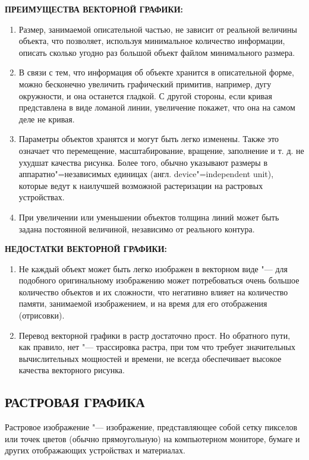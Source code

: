 \documentclass[referat]{SCWorks}
\begin{document}
\textbf{ПРЕИМУЩЕСТВА ВЕКТОРНОЙ ГРАФИКИ:}
\begin{enumerate}
    \item Размер, занимаемой описательной частью, не зависит от реальной величины объекта, что позволяет, используя минимальное количество информации, описать сколько угодно раз большой объект файлом минимального размера.
    \item В связи с тем, что информация об объекте хранится в описательной форме, можно бесконечно увеличить графический примитив, например, дугу окружности, и она останется гладкой. С другой стороны, если кривая представлена в виде ломаной линии, увеличение покажет, что она на самом деле не кривая.
    \item Параметры объектов хранятся и могут быть легко изменены. Также это означает что перемещение, масштабирование, вращение, заполнение и т. д. не ухудшат качества рисунка. Более того, обычно указывают размеры в аппаратно"=независимых единицах (англ. device"=independent unit), которые ведут к наилучшей возможной растеризации на растровых устройствах.
    \item  При увеличении или уменьшении объектов толщина линий может быть задана постоянной величиной, независимо от реального контура.
\end{enumerate}

\textbf{НЕДОСТАТКИ ВЕКТОРНОЙ ГРАФИКИ:}
\begin{enumerate}
    \item Не каждый объект может быть легко изображен в векторном виде "--- для подобного оригинальному изображению может потребоваться очень большое количество объектов и их сложности, что негативно влияет на количество памяти, занимаемой изображением, и на время для его отображения (отрисовки).
    \item Перевод векторной графики в растр достаточно прост. Но обратного пути, как правило, нет "--- трассировка растра, при том что требует значительных вычислительных мощностей и времени, не всегда обеспечивает высокое качества векторного рисунка.
\end{enumerate}

\subsection{РАСТРОВАЯ ГРАФИКА}
Растровое изображение "--- изображение, представляющее собой сетку пикселов или точек цветов (обычно прямоугольную) на компьютерном мониторе, бумаге и других отображающих устройствах и материалах.
\end{document}
